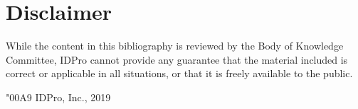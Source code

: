 \section{Disclaimer}

While the content in this bibliography is reviewed by the Body of Knowledge Committee, IDPro cannot provide any guarantee that the material included is correct or applicable in all situations, or that it is freely available to the public.

\vspace*{6in}
\char"00A9 IDPro, Inc., 2019
\clearpage
{} 
